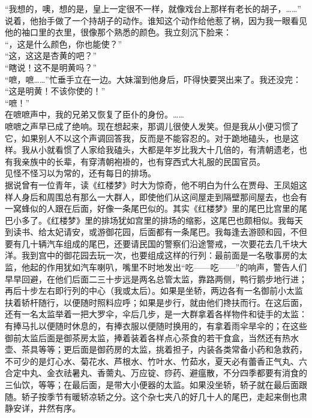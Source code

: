 “我想的，噢，想的是，皇上一定很不一样，就像戏台上那样有老长的胡子，……”\\

说着，他抬手做了一个持胡子的动作。谁知这个动作给他惹了祸，因为我一眼看见他的袖口里的衣里，很像那个熟悉的颜色。我立刻沉下脸来：\\

“，这是什么颜色，你也能使？”\\

“这，这这是杏黄的吧？”\\

“瞎说！这不是明黄吗？”\\

“嗻，嗻……”忙垂手立在一边。大妹溜到他身后，吓得快要哭出来了。我还没完：\\

“这是明黄！不该你使的！”\\

“嗻！”\\

在嗻嗻声中，我的兄弟又恢复了臣仆的身份。……\\

嗻嗻之声早已成了绝响。现在想起来，那调儿很使人发笑。但是我从小便习惯了它，如果别人不以这个声调回答我，反而是不能容忍的。对于跪地磕头，也是这样。我从小就看惯了人家给我磕头，大都是年岁比我大十几倍的，有清朝遗老，也有我亲族中的长辈，有穿清朝袍褂的，也有穿西式大礼服的民国官员。\\

见怪不怪习以为常的，还有每日的排场。\\

据说曾有一位青年，读《红楼梦》时大为惊奇，他不明白为什么在贾母、王凤姐这样人身后和周围总有那么一大群人，即使他们从这间屋走到隔壁那间屋去，也会有一窝蜂似的人跟在后面，好像一条尾巴似的。其实《红楼梦》里的尾巴比宫里的尾巴小多了。《红楼梦》里的排场犹如宫里的排场的缩影，这尾巴也颇相似。我每天到读书、给太妃请安，或游御花园，后面都有一条尾巴。我每逢去游颐和园，不但要有几十辆汽车组成的尾巴，还要请民国的警察们沿途警戒，一次要花去几千块大洋。我到宫中的御花园去玩一次，也要组成这样的行列：最前面是一名敬事房的太监，他起的作用犹如汽车喇叭，嘴里不时地发出“吃——吃——”的响声，警告人们早早回避，在他们后面二三十步远是两名总管太监，靠路两侧，鸭行鹅步地行进；再后十步左右即行列的中心（我或太后）。如果是坐轿，两边各有一名御前小太监扶着轿杆随行，以便随时照料应呼；如果是步行，就由他们搀扶而行。在这后面，还有一名太监举着一把大罗伞，伞后几步，是一大群拿着各样物件和徒手的太监：有捧马扎以便随时休息的，有捧衣服以便随时换用的，有拿着雨伞旱伞的；在这些御前太监后面是御茶房太监，捧着装着各样点心茶食的若干食盒，当然还有热水壶、茶具等等；更后面是御药房的太监，挑着担子，内装各类常备小药和急救药，不可少的是灯心水、菊花水、芦根水、竹叶水、竹茹水，夏天必有蕾香正气丸、六合定中丸、金衣祛暑丸、香薷丸、万应锭、痧药、避瘟散，不分四季都要有消食的三仙饮，等等；在最后面，是带大小便器的太监。如果没坐轿，轿子就在最后面跟随。轿子按季节有暖轿凉轿之分。这个杂七夹八的好几十人的尾巴，走起来倒也肃静安详，井然有序。\\

